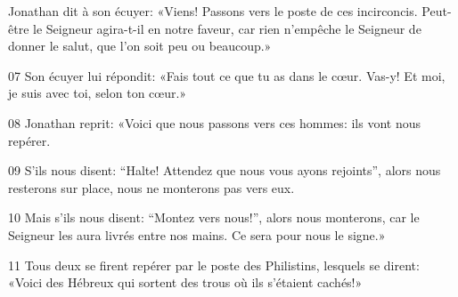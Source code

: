  Jonathan dit à son écuyer: «Viens! Passons vers le poste de ces incirconcis. Peut-être le Seigneur agira-t-il en notre faveur, car rien n’empêche le Seigneur de donner le salut, que l’on soit peu ou beaucoup.»

07 Son écuyer lui répondit: «Fais tout ce que tu as dans le cœur. Vas-y! Et moi, je suis avec toi, selon ton cœur.»

08 Jonathan reprit: «Voici que nous passons vers ces hommes: ils vont nous repérer.

09 S’ils nous disent: “Halte! Attendez que nous vous ayons rejoints”, alors nous resterons sur place, nous ne monterons pas vers eux.

10 Mais s’ils nous disent: “Montez vers nous!”, alors nous monterons, car le Seigneur les aura livrés entre nos mains. Ce sera pour nous le signe.»

11 Tous deux se firent repérer par le poste des Philistins, lesquels se dirent: «Voici des Hébreux qui sortent des trous où ils s’étaient cachés!»
